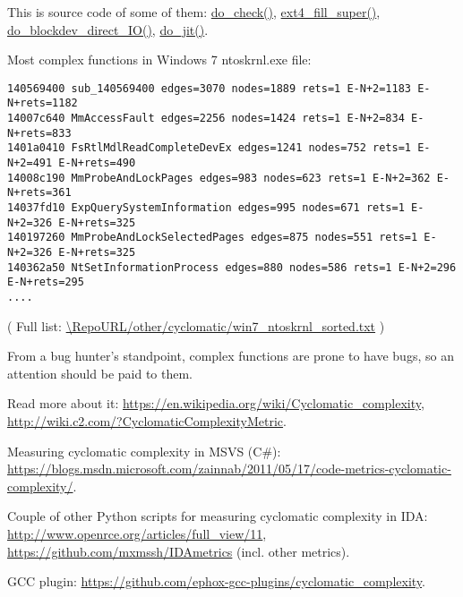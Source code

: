 This is source code of some of them:
\href{https://github.com/torvalds/linux/blob/56868a460b83c0f93d339256a81064d89aadae8e/kernel/bpf/verifier.c\#L2811}{do\_check()},
\href{https://github.com/torvalds/linux/blob/0fcc3ab23d7395f58e8ab0834e7913e2e4314a83/fs/ext4/super.c\#L3358}{ext4\_fill\_super()},
\href{https://github.com/torvalds/linux/blob/86292b33d4b79ee03e2f43ea0381ef85f077c760/fs/direct-io.c\#L1107}{do\_blockdev\_direct\_IO()},
\href{https://github.com/torvalds/linux/blob/bf5f89463f5b3109a72ed13ca62b57e90213387d/arch/x86/net/bpf_jit_comp.c\#L351}{do\_jit()}.

Most complex functions in Windows 7 ntoskrnl.exe file:

\begin{lstlisting}
140569400 sub_140569400 edges=3070 nodes=1889 rets=1 E-N+2=1183 E-N+rets=1182
14007c640 MmAccessFault edges=2256 nodes=1424 rets=1 E-N+2=834 E-N+rets=833
1401a0410 FsRtlMdlReadCompleteDevEx edges=1241 nodes=752 rets=1 E-N+2=491 E-N+rets=490
14008c190 MmProbeAndLockPages edges=983 nodes=623 rets=1 E-N+2=362 E-N+rets=361
14037fd10 ExpQuerySystemInformation edges=995 nodes=671 rets=1 E-N+2=326 E-N+rets=325
140197260 MmProbeAndLockSelectedPages edges=875 nodes=551 rets=1 E-N+2=326 E-N+rets=325
140362a50 NtSetInformationProcess edges=880 nodes=586 rets=1 E-N+2=296 E-N+rets=295
....
\end{lstlisting}

( Full list: \url{\RepoURL/other/cyclomatic/win7_ntoskrnl_sorted.txt} )

From a bug hunter's standpoint, complex functions are prone to have bugs, so an attention should be paid to them.

Read more about it:
\url{https://en.wikipedia.org/wiki/Cyclomatic_complexity},
\url{http://wiki.c2.com/?CyclomaticComplexityMetric}.

Measuring cyclomatic complexity in MSVS (C\#):
\url{https://blogs.msdn.microsoft.com/zainnab/2011/05/17/code-metrics-cyclomatic-complexity/}.

Couple of other Python scripts for measuring cyclomatic complexity in IDA:
\url{http://www.openrce.org/articles/full_view/11},
\url{https://github.com/mxmssh/IDAmetrics} (incl. other metrics).

GCC plugin:
\url{https://github.com/ephox-gcc-plugins/cyclomatic_complexity}.

